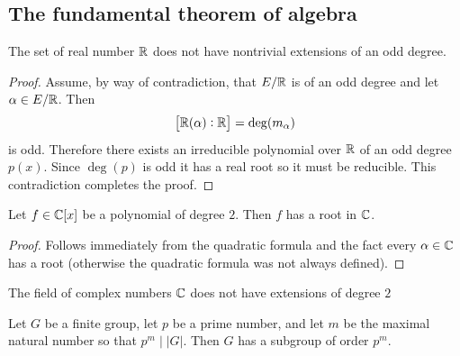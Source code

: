 \documentclass[11pt,a4paper]{article}
\begin{document}
\subsection{The fundamental theorem of algebra}
\begin{lemma}
  \label{lem:R-has-no-nontrivial-extensions-of-odd-degree}
  The set of real number $\mathbb{R}$ does not have nontrivial extensions
  of an odd degree.
\end{lemma}
\begin{proof}
  Assume, by way of contradiction, that $E/\mathbb{R}$ is of an odd degree
  and let $\alpha \in E/\mathbb{R}$.
  Then
  \[
    \left[\mathbb{R}(\alpha) : \mathbb{R}\right] = \deg(m_{\alpha})
  \]
  is odd.
  Therefore there exists an irreducible polynomial over $\mathbb{R}$ of
  an odd degree $p(x)$.
  Since $\deg(p)$ is odd it has a real root so it must be reducible.
  This contradiction completes the proof.
\end{proof}

\begin{lemma}
  Let $f \in \mathbb{C}[x]$ be a polynomial of degree $2$.
  Then $f$ has a root in $\mathbb{C}$.
\end{lemma}
\begin{proof}
  Follows immediately from the quadratic formula
  and the fact every $\alpha \in \mathbb{C}$ has a root
  (otherwise the quadratic formula was not always defined).
\end{proof}

\begin{corollary}
  \label{cor:C-has-no-extensions-of-degree-two}
  The field of complex numbers $\mathbb{C}$ does not have extensions of degree $2$
\end{corollary}


\begin{theorem}
  Let $G$ be a finite group, let $p$ be a prime number,
  and let $m$ be the maximal natural number so that $p^m \mid |G|$.
  Then $G$ has a subgroup of order $p^m$.
\end{theorem}
\end{document}

